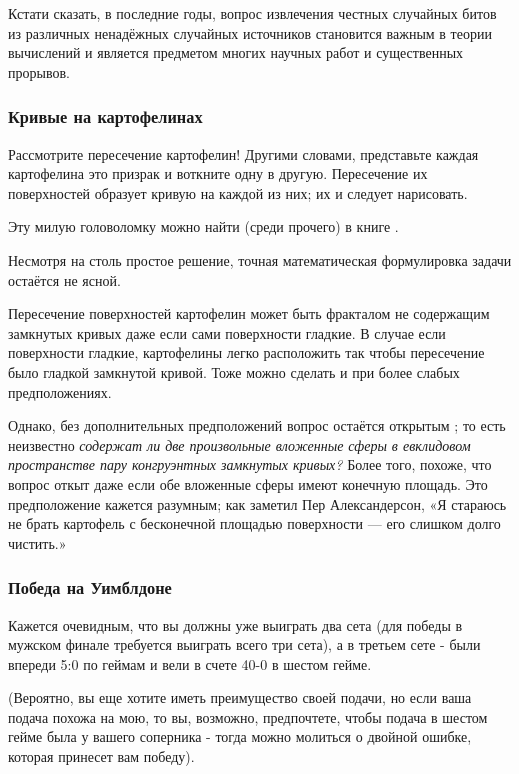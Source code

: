 Кстати сказать, в последние годы, вопрос извлечения честных случайных битов из различных ненадёжных случайных источников становится важным в теории вычислений и является предметом многих научных работ и существенных прорывов.

\subsubsection*{Кривые на картофелинах}

Рассмотрите пересечение картофелин!
Другими словами, представьте каждая картофелина это призрак и воткните одну в другую.
Пересечение их поверхностей образует кривую на каждой из них; их и следует нарисовать.

Эту милую головоломку можно найти (среди прочего) в книге \cite{berlekamp-rodgers}.

\begin{addedbytheeditors}
Несмотря на столь простое решение, точная математическая формулировка задачи остаётся не ясной.

Пересечение поверхностей картофелин может быть фракталом не содержащим замкнутых кривых даже если сами поверхности гладкие.
В случае если поверхности гладкие, картофелины легко расположить так чтобы пересечение было гладкой замкнутой кривой.
Тоже можно сделать и при более слабых предположениях.

Однако, без дополнительных предположений вопрос остаётся открытым \cite{agol};
то есть неизвестно \emph{содержат ли две произвольные вложенные сферы в евклидовом пространстве пару конгруэнтных замкнутых кривых?} 
Более того, похоже, что вопрос откыт даже если обе вложенные сферы имеют конечную площадь.
Это предположение кажется разумным; как заметил Пер Александерсон,
«Я стараюсь не брать картофель с бесконечной площадью поверхности --- его слишком долго чистить.»
\end{addedbytheeditors}

\subsubsection*{Победа на Уимблдоне}

Кажется очевидным, что вы должны уже выиграть два сета (для победы в
мужском финале требуется
выиграть всего три сета), а в третьем сете - были впереди 5:0 по
геймам и вели в счете 40-0 в шестом гейме.

(Вероятно, вы еще хотите иметь преимущество своей подачи, но если ваша
подача похожа на мою,
то вы, возможно, предпочтете, чтобы подача в шестом гейме была у
вашего соперника - тогда можно
молиться о двойной ошибке, которая принесет вам победу).

